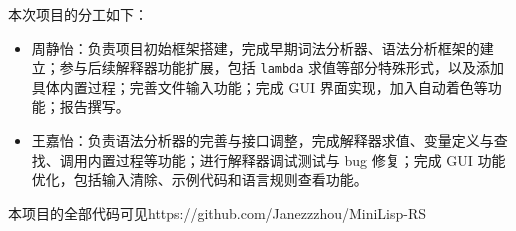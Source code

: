\documentclass[12pt, a4paper]{ctexart}
\begin{document}
本次项目的分工如下：

\begin{itemize}
\item 周静怡：负责项目初始框架搭建，完成早期词法分析器、语法分析框架的建立；参与后续解释器功能扩展，包括 \verb|lambda| 求值等部分特殊形式，以及添加具体内置过程；完善文件输入功能；完成 GUI 界面实现，加入自动着色等功能；报告撰写。
\item 王嘉怡：负责语法分析器的完善与接口调整，完成解释器求值、变量定义与查找、调用内置过程等功能；进行解释器调试测试与 bug 修复；完成 GUI 功能优化，包括输入清除、示例代码和语言规则查看功能。
\end{itemize}

本项目的全部代码可见https://github.com/Janezzzhou/MiniLisp-RS
\end{document}
